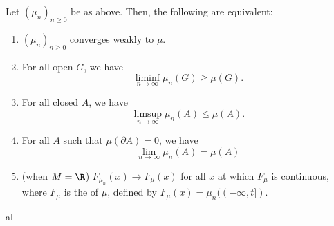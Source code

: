 \documentclass[a4paper]{article}
\begin{document}
\begin{prop}
  Let $(\mu_n)_{n \geq 0}$ be as above. Then, the following are equivalent:
  \begin{enumerate}
    \item $(\mu_n)_{n \geq 0}$ converges weakly to $\mu$.
    \item For all open $G$, we have
      \[
        \liminf_{n \to \infty} \mu_n(G) \geq \mu(G).
      \]
    \item For all closed $A$, we have
      \[
        \limsup_{n \to \infty} \mu_n(A) \leq \mu(A).
      \]
    \item For all $A$ such that $\mu(\partial A) = 0$, we have
      \[
        \lim_{n \to \infty}\mu_n(A) = \mu(A)
      \]
    \item (when $M = \R$) $F_{\mu_n}(x) \to F_\mu(x)$ for all $x$ at which $F_\mu$ is continuous, where $F_\mu$ is the  of $\mu$, defined by $F_\mu(x) = \mu_n((-\infty, t])$.
  \end{enumerate}
\end{prop}
al
\end{document}
